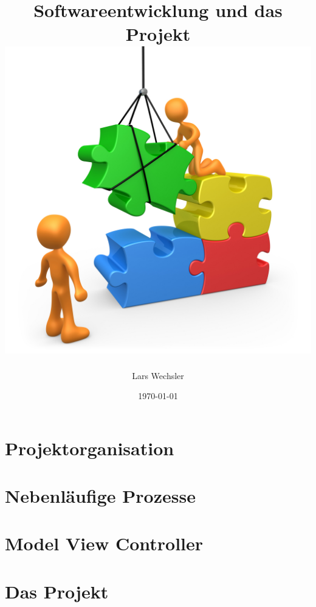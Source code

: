 \documentclass{article}
\author{Lars Wechsler}
\title{Softwareentwicklung und \textbf{das Projekt} \\ \includegraphics[scale=0.7]{../media/puzzle_cartoon.jpg}}
\date{\today}
\begin{document}
\maketitle
\newpage
\tableofcontents
\newpage 

\section{Projektorganisation}


\newpage

\section{Nebenläufige Prozesse}


\newpage

\section{Model View Controller}


\newpage 


\section{Das Projekt}

\end{document}
